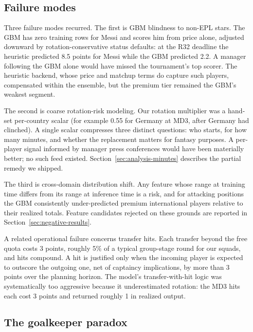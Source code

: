 \subsection{Failure modes}
\label{sec:analysis-failures}

Three failure modes recurred. The first is GBM blindness to non-EPL
stars. The GBM has zero training rows for Messi and scores him from
price alone, adjusted downward by rotation-conservative status
defaults: at the R32 deadline the heuristic predicted 8.5 points for
Messi while the GBM predicted 2.2. A manager following the GBM alone
would have missed the tournament's top scorer. The heuristic backend,
whose price and matchup terms do capture such players, compensated
within the ensemble, but the premium tier remained the GBM's weakest
segment.

The second is coarse rotation-risk modeling. Our rotation multiplier
was a hand-set per-country scalar (for example 0.55 for Germany at MD3,
after Germany had clinched). A single scalar compresses three distinct
questions: who starts, for how many minutes, and whether the
replacement matters for fantasy purposes. A per-player signal informed
by manager press conferences would have been materially better; no such
feed existed. Section~\ref{sec:analysis-minutes} describes the partial
remedy we shipped.

The third is cross-domain distribution shift. Any feature whose range
at training time differs from its range at inference time is a risk,
and for attacking positions the GBM consistently under-predicted
premium international players relative to their realized totals.
Feature candidates rejected on these grounds are reported in
Section~\ref{sec:negative-results}.

A related operational failure concerns transfer hits. Each transfer
beyond the free quota costs 3 points, roughly 5\% of a typical
group-stage round for our squads, and hits compound. A hit is justified
only when the incoming player is expected to outscore the outgoing one,
net of captaincy implications, by more than 3 points over the planning
horizon. The model's transfer-with-hit logic was systematically too
aggressive because it underestimated rotation: the MD3 hits each cost 3
points and returned roughly 1 in realized output.

\subsection{The goalkeeper paradox}
\label{sec:analysis-gk}

